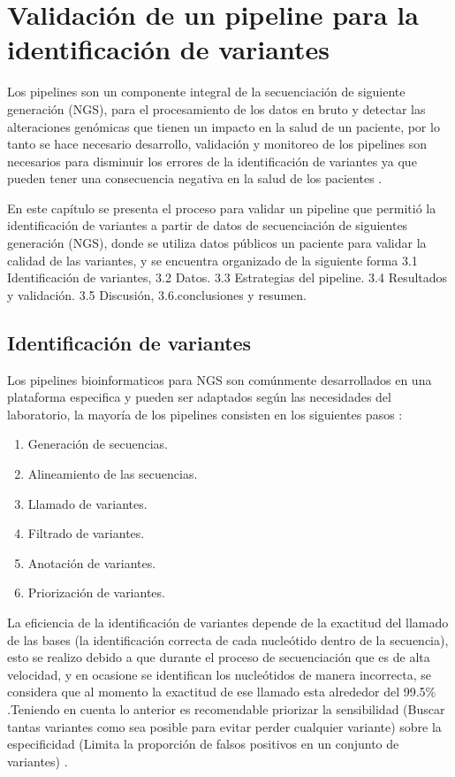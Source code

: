 \chapter{Validación de un pipeline para la identificación de variantes}

Los pipelines son un componente integral de la secuenciación de siguiente generación (NGS), para el procesamiento de los datos en bruto y detectar las alteraciones genómicas que tienen un impacto en la salud de un paciente, por lo tanto se hace necesario desarrollo, validación y monitoreo de los pipelines son necesarios para disminuir los errores de la identificación de variantes ya que pueden tener una consecuencia negativa en la salud de los pacientes \cite{Roy2018}.

En este capítulo se presenta el proceso para validar un pipeline que permitió la  identificación de variantes a partir de datos de secuenciación de siguientes generación (NGS), donde se utiliza datos públicos un paciente  para validar la calidad  de las variantes, y se encuentra organizado de la siguiente forma 3.1 Identificación de variantes, 3.2 Datos. 3.3 Estrategias del pipeline. 3.4 Resultados y validación. 3.5 Discusión, 3.6.conclusiones y  resumen. 

\section{Identificación de variantes}

Los pipelines bioinformaticos para NGS son comúnmente desarrollados en una plataforma especifica y pueden ser adaptados según las necesidades del laboratorio, la mayoría de los pipelines consisten en los siguientes pasos \cite{Roy2018}:

\begin{enumerate}[1.]
	\item Generación de secuencias.
	\item Alineamiento de las secuencias.
	\item Llamado de variantes.
	\item Filtrado de variantes.
	\item Anotación de variantes.
	\item Priorización de variantes. 
\end{enumerate}
 

La eficiencia de la identificación de variantes depende de la exactitud del llamado de las bases (la identificación correcta de cada nucleótido dentro de la secuencia), esto se realizo debido a que durante el proceso de secuenciación que es de alta velocidad, y en ocasione se identifican los nucleótidos de manera incorrecta, se considera que al momento la exactitud de ese llamado esta alrededor del 99.5\% \cite{Tetreault2015}.Teniendo en cuenta lo anterior es recomendable  priorizar la sensibilidad (Buscar tantas variantes como sea posible para evitar perder cualquier variante) sobre la especificidad (Limita la proporción de falsos positivos en un conjunto de variantes) \cite{Auwera2014}.  \\

